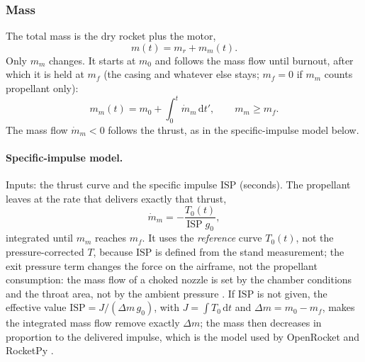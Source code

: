 \subsubsection{Mass}\label{sec:mass_mass}
The total mass is the dry rocket plus the motor,
\begin{equation}\label{eq:mass_total}
    m(t) = m_r + m_m(t).
\end{equation}
Only $m_m$ changes. It starts at $m_0$ and follows the mass flow until burnout, after which it is
held at $m_f$ (the casing and whatever else stays; $m_f=0$ if $m_m$ counts propellant only):
\begin{equation}\label{eq:mass_motor}
    m_m(t) = m_0 + \int_0^t \dot m_m\,\mathrm{d}t', \qquad m_m\ge m_f.
\end{equation}
The mass flow $\dot m_m<0$ follows the thrust, as in the specific-impulse model below.

\paragraph{Specific-impulse model.} Inputs: the thrust curve and the specific impulse
$\mathrm{ISP}$ (seconds). The propellant leaves at the rate that delivers exactly that thrust,
\begin{equation}\label{eq:mass_isp}
    \dot m_m = -\frac{T_0(t)}{\mathrm{ISP}\;g_0},
\end{equation}
integrated until $m_m$ reaches $m_f$. It uses the \emph{reference} curve $T_0(t)$, not the
pressure-corrected $T$, because $\mathrm{ISP}$ is defined from the stand measurement; the exit
pressure term changes the force on the airframe, not the propellant consumption: the mass flow of
a choked nozzle is set by the chamber conditions and the throat area, not by the ambient pressure
\cite{sutton}. If $\mathrm{ISP}$
is not given, the effective value $\mathrm{ISP}=J/(\Delta m\,g_0)$, with $J=\int T_0\,\mathrm{d}t$
and $\Delta m=m_0-m_f$, makes the integrated mass flow remove exactly $\Delta m$; the mass then
decreases in proportion to the delivered impulse, which is the model used by OpenRocket and
RocketPy \cite{ordev,hpr}.



